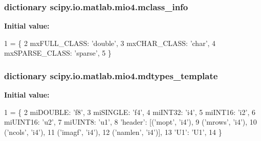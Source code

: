 \subsubsection[{mclass\+\_\+info}]{\setlength{\rightskip}{0pt plus 5cm}dictionary scipy.\+io.\+matlab.\+mio4.\+mclass\+\_\+info}\label{namespacescipy_1_1io_1_1matlab_1_1mio4_abe01bc326de3c5d052c18aa902ee1961}
{\bfseries Initial value\+:}
\begin{DoxyCode}
1 = \{
2     mxFULL\_CLASS: \textcolor{stringliteral}{'double'},
3     mxCHAR\_CLASS: \textcolor{stringliteral}{'char'},
4     mxSPARSE\_CLASS: \textcolor{stringliteral}{'sparse'},
5     \}
\end{DoxyCode}
\hypertarget{namespacescipy_1_1io_1_1matlab_1_1mio4_aca711630f56fcd5da1403d40d703e157}{}
\subsubsection[{mdtypes\+\_\+template}]{\setlength{\rightskip}{0pt plus 5cm}dictionary scipy.\+io.\+matlab.\+mio4.\+mdtypes\+\_\+template}\label{namespacescipy_1_1io_1_1matlab_1_1mio4_aca711630f56fcd5da1403d40d703e157}
{\bfseries Initial value\+:}
\begin{DoxyCode}
1 = \{
2     miDOUBLE: \textcolor{stringliteral}{'f8'},
3     miSINGLE: \textcolor{stringliteral}{'f4'},
4     miINT32: \textcolor{stringliteral}{'i4'},
5     miINT16: \textcolor{stringliteral}{'i2'},
6     miUINT16: \textcolor{stringliteral}{'u2'},
7     miUINT8: \textcolor{stringliteral}{'u1'},
8     \textcolor{stringliteral}{'header'}: [(\textcolor{stringliteral}{'mopt'}, \textcolor{stringliteral}{'i4'}),
9                (\textcolor{stringliteral}{'mrows'}, \textcolor{stringliteral}{'i4'}),
10                (\textcolor{stringliteral}{'ncols'}, \textcolor{stringliteral}{'i4'}),
11                (\textcolor{stringliteral}{'imagf'}, \textcolor{stringliteral}{'i4'}),
12                (\textcolor{stringliteral}{'namlen'}, \textcolor{stringliteral}{'i4'})],
13     \textcolor{stringliteral}{'U1'}: \textcolor{stringliteral}{'U1'},
14     \}
\end{DoxyCode}
\hypertarget{namespacescipy_1_1io_1_1matlab_1_1mio4_ae07035c6e0171210c874f1d1476d8e97}{}
